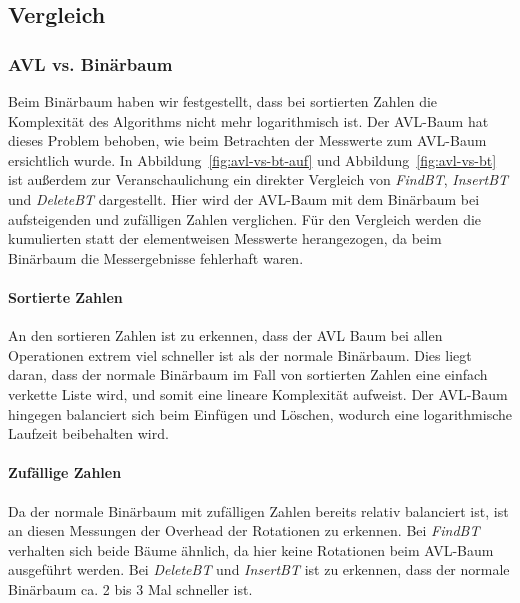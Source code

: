 
\subsection{Vergleich}\label{subsec:vergleich}

\subsubsection{AVL vs. Binärbaum}
Beim Binärbaum haben wir festgestellt, dass bei sortierten Zahlen die Komplexität des
Algorithms nicht mehr logarithmisch ist.
Der AVL-Baum hat dieses Problem behoben, wie beim Betrachten der Messwerte zum AVL-Baum
ersichtlich wurde.
In Abbildung~\ref{fig:avl-vs-bt-auf} und Abbildung~\ref{fig:avl-vs-bt} ist außerdem zur
Veranschaulichung ein direkter Vergleich von \textit{FindBT}, \textit{InsertBT} und \textit{DeleteBT}
dargestellt.
Hier wird der AVL-Baum mit dem Binärbaum bei aufsteigenden und zufälligen Zahlen verglichen.
Für den Vergleich werden die kumulierten statt der elementweisen Messwerte herangezogen, da beim
Binärbaum die Messergebnisse fehlerhaft waren.

\paragraph{Sortierte Zahlen}
An den sortieren Zahlen ist zu erkennen, dass der AVL Baum bei allen Operationen extrem viel
schneller ist als der normale Binärbaum.
Dies liegt daran, dass der normale Binärbaum im Fall von sortierten Zahlen eine einfach verkette
Liste wird, und somit eine lineare Komplexität aufweist.
Der AVL-Baum hingegen balanciert sich beim Einfügen und Löschen, wodurch eine logarithmische
Laufzeit beibehalten wird.

\paragraph{Zufällige Zahlen}
Da der normale Binärbaum mit zufälligen Zahlen bereits relativ balanciert ist,
ist an diesen Messungen der Overhead der Rotationen zu erkennen.
Bei \textit{FindBT} verhalten sich beide Bäume ähnlich, da hier keine Rotationen beim AVL-Baum
ausgeführt werden.
Bei \textit{DeleteBT} und \textit{InsertBT} ist zu erkennen, dass der normale Binärbaum ca. 2 bis
3 Mal schneller ist.


